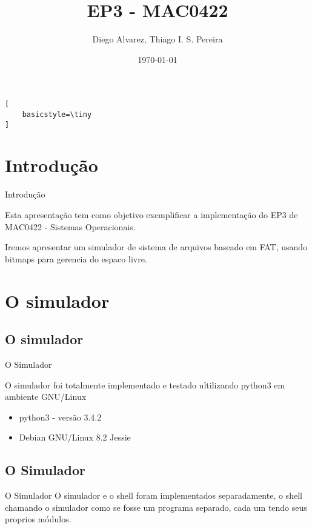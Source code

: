 \documentclass{beamer}
\title[EP3]{EP3 - MAC0422}
\author {Diego Alvarez, Thiago I. S. Pereira}
\date{\today}
\begin{document}
\begin{lstlisting}[
    basicstyle=\tiny
]
\end{lstlisting}

\begin{frame}
  \titlepage
\end{frame}


\section{Introdução}

\begin{frame}{Introdução}

\begin{block}{}
\par Esta apresentação tem como objetivo exemplificar a implementação do EP3 de MAC0422 - Sistemas Operacionais. \par Iremos apresentar um simulador de sistema de arquivos baseado em FAT, usando bitmaps para gerencia do espaco livre.
\end{block}

\end{frame}

\section{O simulador}

\subsection{O simulador}

\begin{frame}{O Simulador}
\par O simulador foi totalmente implementado e testado ultilizando python3 em ambiente GNU/Linux
\vskip 1cm
\begin{itemize}
\setlength\itemsep{1em}
\item python3 - versão 3.4.2
\item Debian GNU/Linux 8.2 Jessie
\end{itemize}
\end{frame}

\subsection{O Simulador}
\begin{frame}{O Simulador}
O simulador e o shell foram implementados separadamente, o shell chamando o simulador como se fosse um programa separado, cada um tendo seus proprios módulos.
\end{frame}
\end{document}
